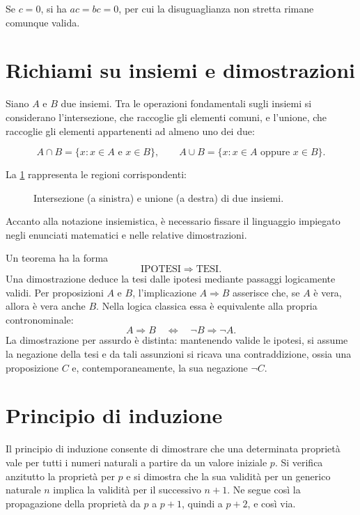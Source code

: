 Se \(c=0\), si ha \(ac=bc=0\), per cui la disuguaglianza non stretta
rimane comunque valida.

\clearpage

\section{Richiami su insiemi e dimostrazioni}
\label{sec:lez01-insiemi-dimostrazioni}

Siano \(A\) e \(B\) due insiemi. Tra le operazioni fondamentali sugli
insiemi si considerano l'intersezione, che raccoglie gli elementi comuni,
e l'unione, che raccoglie gli elementi appartenenti ad almeno uno dei due:

\[
  A\cap B=\{x:x\in A\text{ e }x\in B\},\qquad
  A\cup B=\{x:x\in A\text{ oppure }x\in B\}.
\]

La \cref{fig:venn-operazioni} rappresenta le regioni corrispondenti:

\begin{figure}[htbp]
  \centering
  
  \caption{Intersezione (a sinistra) e unione (a destra) di due insiemi.}
  \label{fig:venn-operazioni}
\end{figure}

Accanto alla notazione insiemistica, è necessario fissare il linguaggio
impiegato negli enunciati matematici e nelle relative dimostrazioni.

Un teorema ha la forma
\[
  \text{IPOTESI}\Longrightarrow\text{TESI}.
\]
Una dimostrazione deduce la tesi dalle ipotesi mediante passaggi logicamente
validi. Per proposizioni \(A\) e \(B\), l'implicazione
\(A\Longrightarrow B\) asserisce che, se \(A\) è vera, allora è vera
anche \(B\). Nella logica classica essa è equivalente alla propria
contronominale:
\[
  A\Rightarrow B\quad\Longleftrightarrow\quad\neg B\Rightarrow\neg A.
\]
La dimostrazione per assurdo è distinta: mantenendo valide le ipotesi, si
assume la negazione della tesi e da tali assunzioni si ricava una
contraddizione, ossia una proposizione \(C\) e, contemporaneamente, la sua
negazione \(\neg C\).

\section{Principio di induzione}
\label{sec:lez01-induzione}

Il principio di induzione consente di dimostrare che una determinata
proprietà vale per tutti i numeri naturali a partire da un valore iniziale
\(p\). Si verifica anzitutto la proprietà per \(p\) e si dimostra che la
sua validità per un generico naturale \(n\) implica la validità per il
successivo \(n+1\). Ne segue così la propagazione della proprietà da
\(p\) a \(p+1\), quindi a \(p+2\), e così via.

